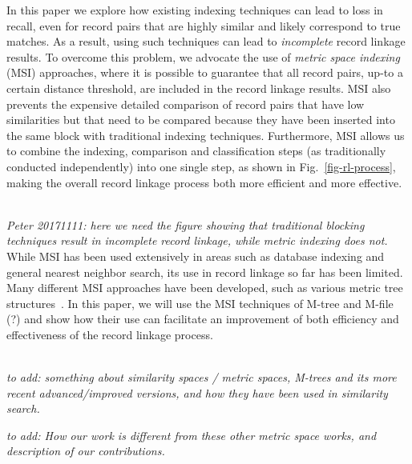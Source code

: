 \documentclass{llncs}
\begin{document}
In this paper we explore how existing indexing techniques can lead to
loss in recall, even for record pairs that are highly similar and
likely correspond to true matches. As a result, using such techniques
can lead to \emph{incomplete} record linkage results. To overcome this
problem, we advocate the use of \emph{metric space indexing} (MSI)
approaches, where it is possible to guarantee that all record pairs,
up-to a certain distance threshold, are included in the record linkage
results. MSI also prevents the expensive detailed comparison of record
pairs that have low similarities but that need to be compared because
they have been inserted into the same block with traditional indexing
techniques. Furthermore, MSI allows us to combine the indexing,
comparison and classification steps (as traditionally conducted
independently) into one single step, as shown in
Fig.~\ref{fig-rl-process}, making the overall record linkage process
both more efficient and more effective.


~ \\
\emph{Peter 20171111: here we need the figure showing that traditional
blocking techniques result in incomplete record linkage, while metric
indexing does not.}
~ \\

While MSI has been used extensively in areas such as database indexing
and general nearest neighbor search, its use in record linkage so far
has been limited. 
Many different MSI approaches have been developed, such as various
metric tree structures~\cite{}. 
In this paper, we will use the MSI techniques of M-tree and M-file (?)
and show how their use can facilitate an improvement of both
efficiency and effectiveness of the record linkage process.

~ \\
\emph{
to add: something about similarity spaces / metric spaces, M-trees and its
more recent advanced/improved versions, and how they have been used in
similarity search.}

\emph{to add: How our work is different from these other metric space works, and
description of our contributions.
}
~ \\
\end{document}
